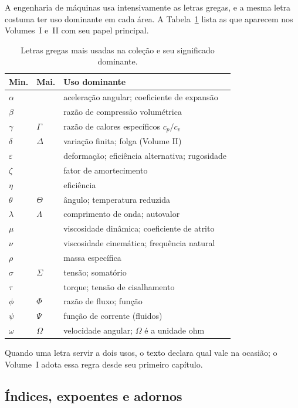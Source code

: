 \documentclass[12pt,a4paper]{article}
\numberwithin{equation}{section}
\numberwithin{table}{section}
\numberwithin{figure}{section}
\begin{document}
A engenharia de máquinas usa intensivamente as letras gregas, e a mesma
letra costuma ter uso dominante em cada área. A Tabela~\ref{tab:v0-c2-2}
lista as que aparecem nos Volumes~I e~II com seu papel principal.

\begin{table}[H]
\centering
\caption[Letras gregas e seu uso dominante nesta coleção.]{%
Letras gregas mais usadas na coleção e seu significado dominante.}
\label{tab:v0-c2-2}
\begin{tabularx}{\textwidth}{llX}
\toprule
\textbf{Min.} & \textbf{Mai.} & \textbf{Uso dominante} \\
\midrule
$\alpha$ & & aceleração angular; coeficiente de expansão \\
$\beta$ & & razão de compressão volumétrica \\
$\gamma$ & $\Gamma$ & razão de calores específicos $c_p/c_v$ \\
$\delta$ & $\Delta$ & variação finita; folga (Volume II) \\
$\varepsilon$ & & deformação; eficiência alternativa; rugosidade \\
$\zeta$ & & fator de amortecimento \\
$\eta$ & & eficiência \\
$\theta$ & $\Theta$ & ângulo; temperatura reduzida \\
$\lambda$ & $\Lambda$ & comprimento de onda; autovalor \\
$\mu$ & & viscosidade dinâmica; coeficiente de atrito \\
$\nu$ & & viscosidade cinemática; frequência natural \\
$\rho$ & & massa específica \\
$\sigma$ & $\Sigma$ & tensão; somatório \\
$\tau$ & & torque; tensão de cisalhamento \\
$\phi$ & $\Phi$ & razão de fluxo; função \\
$\psi$ & $\Psi$ & função de corrente (fluidos) \\
$\omega$ & $\Omega$ & velocidade angular; $\Omega$ é a unidade ohm \\
\bottomrule
\end{tabularx}
\end{table}

Quando uma letra servir a dois usos, o texto declara qual vale na ocasião;
o Volume~I adota essa regra desde seu primeiro capítulo.

\subsection{Índices, expoentes e adornos}
\end{document}
